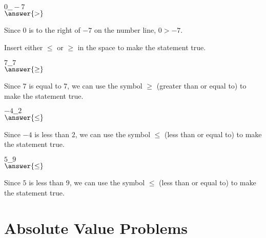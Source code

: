 \documentclass{ximera}
\begin{document}
\begin{problem}
$0\_\_-7$\\
$\answer{>}$

\begin{feedback}
Since $0$ is to the right of $-7$ on the number line, $0 > -7$.
\end{feedback}

\end{problem}



Insert either $\leq$ or $\geq$ in the space to make the statement true.

\begin{problem}
$7\_\_7$\\
$\answer{\geq}$

\begin{feedback}
Since $7$ is equal to $7$, we can use the symbol $\geq$ (greater than or equal to) to make the statement true.
\end{feedback}

\end{problem}

\begin{problem}
$-4\_\_2$\\
$\answer{\leq}$

\begin{feedback}
Since $-4$ is less than $2$, we can use the symbol $\leq$ (less than or equal to) to make the statement true.
\end{feedback}

\end{problem}

\begin{problem}
$5\_\_9$\\
$\answer{\leq}$

\begin{feedback}
Since $5$ is less than $9$, we can use the symbol $\leq$ (less than or equal to) to make the statement true.
\end{feedback}

\end{problem}



\section*{Absolute Value Problems}
\end{document}
